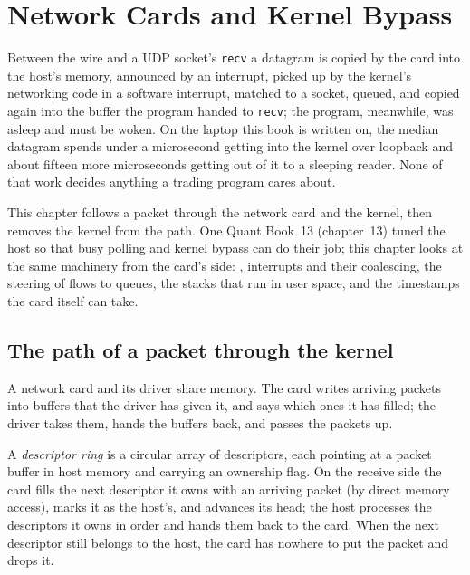 \chapter{Network Cards and Kernel Bypass}\label{ch:nw:network-cards-and-kernel-bypass}

Between the wire and a UDP socket's \texttt{recv} a datagram is copied by the card into the host's memory, announced by an
interrupt, picked up by the kernel's networking code in a software interrupt, matched to a socket, queued, and copied again into
the buffer the program handed to \texttt{recv}; the program, meanwhile, was asleep and must be woken. On the laptop this book is
written on, the median datagram spends under a microsecond getting into the kernel over loopback and about fifteen more
microseconds getting out of it to a sleeping reader. None of that work decides anything a trading program cares about.

This chapter follows a packet through the network card and the kernel, then removes the kernel from the path. One Quant
Book~13 (chapter~13) tuned the host so that busy polling and kernel bypass can do their job; this chapter looks at the same
machinery from the card's side: , interrupts and their coalescing, the steering of flows to queues, the stacks
that run in user space, and the timestamps the card itself can take.

\section{The path of a packet through the kernel}

A network card and its driver share memory. The card writes arriving packets into buffers that the driver has given it,
and says which ones it has filled; the driver takes them, hands the buffers back, and passes the packets up.

\begin{definition}\label{def:nw:network-cards-and-kernel-bypass:ring}
A \emph{descriptor ring} is a circular array of descriptors, each pointing at a packet buffer in host memory
and carrying an ownership flag. On the receive side the card fills the next descriptor it owns with an arriving packet (by direct
memory access), marks it as the host's, and advances its head; the host processes the descriptors it owns in order and hands them
back to the card. When the next descriptor still belongs to the host, the card has nowhere to put the packet and drops it.
\end{definition}


